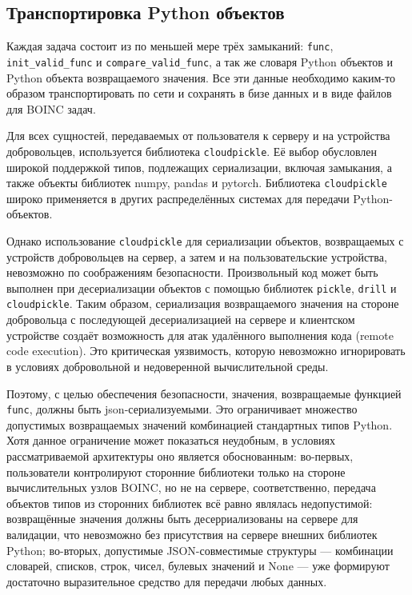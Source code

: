 \documentclass[a4paper,12pt]{extarticle}
\begin{document}
\subsection{Транспортировка Python объектов}

Каждая задача состоит из по меньшей мере трёх замыканий: \texttt{func}, \texttt{init\_valid\_func} и \texttt{compare\_valid\_func}, а так же словаря Python объектов и Python объекта возвращаемого значения. Все эти данные необходимо каким-то образом транспортировать по сети и сохранять в бизе данных и в виде файлов для BOINC задач.

Для всех сущностей, передаваемых от пользователя к серверу и на устройства добровольцев, используется библиотека \texttt{cloudpickle}. Её выбор обусловлен широкой поддержкой типов, подлежащих сериализации, включая замыкания, а также объекты библиотек numpy, pandas и pytorch. Библиотека \texttt{cloudpickle} широко применяется в других распределённых системах для передачи Python-объектов.

Однако использование \texttt{cloudpickle} для сериализации объектов, возвращаемых с \newline устройств добровольцев на сервер, а затем и на пользовательские устройства, невозможно по соображениям безопасности. Произвольный код может быть выполнен при десериализации объектов с помощью библиотек \texttt{pickle}, \texttt{drill} и \texttt{cloudpickle}. Таким образом, сериализация возвращаемого значения на стороне добровольца с последующей десериализацией на сервере и клиентском устройстве создаёт возможность для атак удалённого выполнения кода (remote code execution). Это критическая уязвимость, которую невозможно игнорировать в условиях добровольной и недоверенной вычислительной среды.

Поэтому, с целью обеспечения безопасности, значения, возвращаемые функцией \texttt{func}, должны быть json-сериализуемыми. Это ограничивает множество допустимых возвращаемых значений комбинацией стандартных типов Python. Хотя данное ограничение может показаться неудобным, в условиях рассматриваемой архитектуры оно является обоснованным: во-первых, пользователи контролируют сторонние библиотеки только на стороне вычислительных узлов BOINC, но не на сервере, соответственно, передача объектов типов из сторонних библиотек всё равно являлась недопустимой: возвращённые значения должны быть десерриализованы на сервере для валидации, что невозможно без присутствия на сервере внешних библиотек Python; во-вторых, допустимые JSON-совместимые структуры — комбинации словарей, списков, строк, чисел, булевых значений и None — уже формируют достаточно выразительное средство для передачи любых данных.
\end{document}
